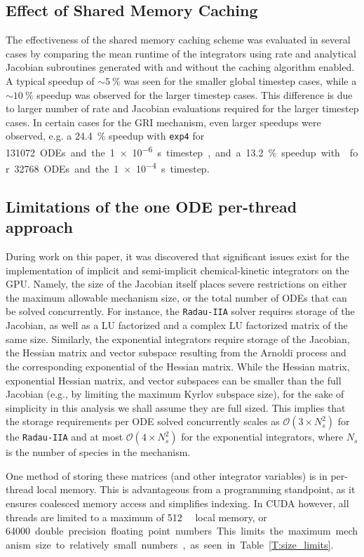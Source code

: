 \documentclass[preprint]{elsarticle}
\begin{document}
\subsection{Effect of Shared Memory Caching}
The effectiveness of the shared memory caching scheme was evaluated in several cases by comparing the mean runtime of the integrators using rate and analytical Jacobian subroutines generated with and without the caching algorithm enabled.
A typical speedup of $\sim\SI{5}{\percent}$ was seen for the smaller global timestep cases, while a $\sim\SI{10}{\percent}$ speedup was observed for the larger timestep cases.
This difference is due to larger number of rate and Jacobian evaluations required for the larger timestep cases.
In certain cases for the GRI mechanism, even larger speedups were observed, e.g. a \SI{24.4}{\percent} speedup with \texttt{exp4} for \SI{131072} ODEs and the \SI{1e-6}{\s} timestep, and a \SI{13.2}{\percent} speedup with  for \SI{32768} ODEs and the \SI{1e-4}{\s} timestep.


\subsection{Limitations of the one ODE per-thread approach}
During work on this paper, it was discovered that significant issues exist for the implementation of implicit and semi-implicit chemical-kinetic integrators on the GPU.
Namely, the size of the Jacobian itself places severe restrictions on either the maximum allowable mechanism size, or the total number of ODEs that can be solved concurrently.
For instance, the \texttt{Radau-IIA} solver requires storage of the Jacobian, as well as a LU factorized and a complex LU factorized matrix of the same size.
Similarly, the exponential integrators require storage of the Jacobian, the Hessian matrix and vector subspace resulting from the Arnoldi process and the corresponding exponential of the Hessian matrix.
While the Hessian matrix, exponential Hessian matrix, and vector subspaces can be smaller than the full Jacobian (e.g., by limiting the maximum Kyrlov subspace size), for the sake of simplicity in this analysis we shall assume they are full sized.
This implies that the storage requirements per ODE solved concurrently scales as $\mathcal{O}\left(3 \times N_s^2\right)$ for the \texttt{Radau-IIA} and at most $\mathcal{O}\left(4 \times N_s^2\right)$ for the exponential integrators, where $N_s$ is the number of species in the mechanism.

One method of storing these matrices (and other integrator variables) is in per-thread local memory.
This is advantageous from a programming standpoint, as it ensures coalesced memory access and simplifies indexing.
In CUDA however, all threads are limited to a maximum of \SI{512}{\kilo\byte} local memory, or \SI{64000} double precision floating point numbers.
This limits the maximum mechanism size to relatively small numbers, as seen in Table~\ref{T:size_limits}.
\end{document}
